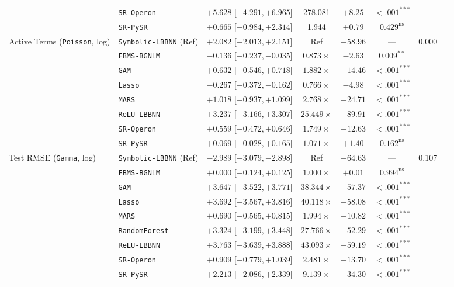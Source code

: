 \begin{table}[htbp]
{{\begin{tabular}{llcccccc}
 & \texttt{SR-Operon} & $+5.628$ [$+4.291, +6.965$] & 278.081 & $+8.25$ & $<.001^{***}$ &  \\
 & \texttt{SR-PySR} & $+0.665$ [$-0.984, +2.314$] & 1.944 & $+0.79$ & $0.429^{\text{ns}}$ &  \\
\midrule
Active Terms (\texttt{Poisson}, log) & \texttt{Symbolic-LBBNN} (Ref) & $+2.082$ [$+2.013, +2.151$] & Ref & $+58.96$ & --- & 0.000 \\
 & \texttt{FBMS-BGNLM} & $-0.136$ [$-0.237, -0.035$] & $0.873\times$ & $-2.63$ & $0.009^{**}$ &  \\
 & \texttt{GAM} & $+0.632$ [$+0.546, +0.718$] & $1.882\times$ & $+14.46$ & $<.001^{***}$ &  \\
 & \texttt{Lasso} & $-0.267$ [$-0.372, -0.162$] & $0.766\times$ & $-4.98$ & $<.001^{***}$ &  \\
 & \texttt{MARS} & $+1.018$ [$+0.937, +1.099$] & $2.768\times$ & $+24.71$ & $<.001^{***}$ &  \\
 & \texttt{ReLU-LBBNN} & $+3.237$ [$+3.166, +3.307$] & $25.449\times$ & $+89.91$ & $<.001^{***}$ &  \\
 & \texttt{SR-Operon} & $+0.559$ [$+0.472, +0.646$] & $1.749\times$ & $+12.63$ & $<.001^{***}$ &  \\
 & \texttt{SR-PySR} & $+0.069$ [$-0.028, +0.165$] & $1.071\times$ & $+1.40$ & $0.162^{\text{ns}}$ &  \\
\midrule
Test RMSE (\texttt{Gamma}, log) & \texttt{Symbolic-LBBNN} (Ref) & $-2.989$ [$-3.079, -2.898$] & Ref & $-64.63$ & --- & 0.107 \\
 & \texttt{FBMS-BGNLM} & $+0.000$ [$-0.124, +0.125$] & $1.000\times$ & $+0.01$ & $0.994^{\text{ns}}$ &  \\
 & \texttt{GAM} & $+3.647$ [$+3.522, +3.771$] & $38.344\times$ & $+57.37$ & $<.001^{***}$ &  \\
 & \texttt{Lasso} & $+3.692$ [$+3.567, +3.816$] & $40.118\times$ & $+58.08$ & $<.001^{***}$ &  \\
 & \texttt{MARS} & $+0.690$ [$+0.565, +0.815$] & $1.994\times$ & $+10.82$ & $<.001^{***}$ &  \\
 & \texttt{RandomForest} & $+3.324$ [$+3.199, +3.448$] & $27.766\times$ & $+52.29$ & $<.001^{***}$ &  \\
 & \texttt{ReLU-LBBNN} & $+3.763$ [$+3.639, +3.888$] & $43.093\times$ & $+59.19$ & $<.001^{***}$ &  \\
 & \texttt{SR-Operon} & $+0.909$ [$+0.779, +1.039$] & $2.481\times$ & $+13.70$ & $<.001^{***}$ &  \\
 & \texttt{SR-PySR} & $+2.213$ [$+2.086, +2.339$] & $9.139\times$ & $+34.30$ & $<.001^{***}$ &  \\

\end{tabular}}}
\end{table}
